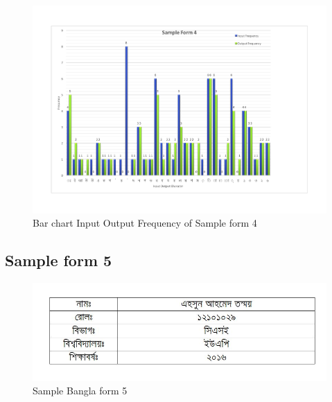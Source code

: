 \begin{figure}[H]
\centering
\includegraphics[width=1\textwidth]{Bform4.pdf}
\caption {Bar chart Input Output Frequency of Sample form 4}
\label {fig:Bbar4}
\end{figure}


\subsection{Sample form 5}
\begin{figure}[H]
\centering
\includegraphics[width=1\textwidth]{formBen05.JPG}
\caption {Sample Bangla form 5}
\label {fig:FormBan5}
\end{figure}

